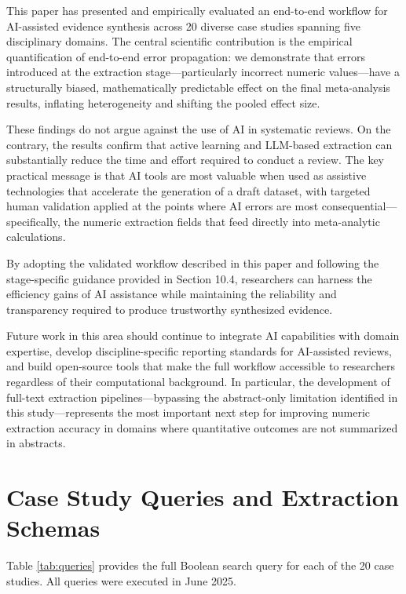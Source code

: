 \documentclass[12pt]{article}
\begin{document}
This paper has presented and empirically evaluated an end-to-end workflow for AI-assisted evidence synthesis across 20 diverse case studies spanning five disciplinary domains. The central scientific contribution is the empirical quantification of end-to-end error propagation: we demonstrate that errors introduced at the extraction stage---particularly incorrect numeric values---have a structurally biased, mathematically predictable effect on the final meta-analysis results, inflating heterogeneity and shifting the pooled effect size.

These findings do not argue against the use of AI in systematic reviews. On the contrary, the results confirm that active learning and LLM-based extraction can substantially reduce the time and effort required to conduct a review. The key practical message is that AI tools are most valuable when used as assistive technologies that accelerate the generation of a draft dataset, with targeted human validation applied at the points where AI errors are most consequential---specifically, the numeric extraction fields that feed directly into meta-analytic calculations.

By adopting the validated workflow described in this paper and following the stage-specific guidance provided in Section 10.4, researchers can harness the efficiency gains of AI assistance while maintaining the reliability and transparency required to produce trustworthy synthesized evidence.

Future work in this area should continue to integrate AI capabilities with domain expertise, develop discipline-specific reporting standards for AI-assisted reviews, and build open-source tools that make the full workflow accessible to researchers regardless of their computational background. In particular, the development of full-text extraction pipelines---bypassing the abstract-only limitation identified in this study---represents the most important next step for improving numeric extraction accuracy in domains where quantitative outcomes are not summarized in abstracts.




\appendix

\section{Case Study Queries and Extraction Schemas}
\label{app:queries}

Table \ref{tab:queries} provides the full Boolean search query for each of the 20 case studies. All queries were executed in June 2025.
\end{document}
